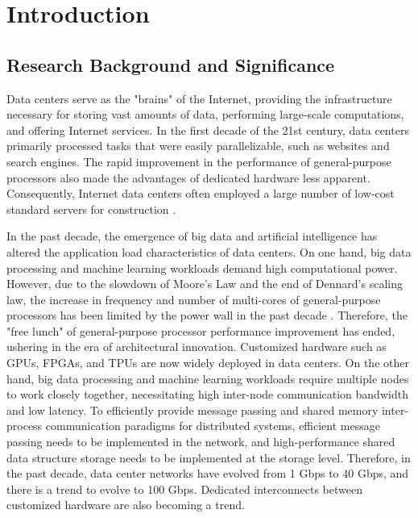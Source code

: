 \chapter{Introduction}
\label{chapter:intro}

\section{Research Background and Significance}
\label{intro:sec:background}

Data centers serve as the "brains" of the Internet, providing the infrastructure necessary for storing vast amounts of data, performing large-scale computations, and offering Internet services. In the first decade of the 21st century, data centers primarily processed tasks that were easily parallelizable, such as websites and search engines. The rapid improvement in the performance of general-purpose processors also made the advantages of dedicated hardware less apparent. Consequently, Internet data centers often employed a large number of low-cost standard servers for construction \cite{barroso2009datacenter}.

In the past decade, the emergence of big data and artificial intelligence has altered the application load characteristics of data centers. On one hand, big data processing and machine learning workloads demand high computational power. However, due to the slowdown of Moore's Law and the end of Dennard's scaling law, the increase in frequency and number of multi-cores of general-purpose processors has been limited by the power wall in the past decade \cite{borkar2011future}. Therefore, the "free lunch" of general-purpose processor performance improvement has ended, ushering in the era of architectural innovation. Customized hardware such as GPUs, FPGAs, and TPUs \cite{jouppi2018motivation} are now widely deployed in data centers. On the other hand, big data processing and machine learning workloads require multiple nodes to work closely together, necessitating high inter-node communication bandwidth and low latency. To efficiently provide message passing and shared memory inter-process communication paradigms for distributed systems, efficient message passing needs to be implemented in the network, and high-performance shared data structure storage needs to be implemented at the storage level. Therefore, in the past decade, data center networks have evolved from 1 Gbps to 40 Gbps, and there is a trend to evolve to 100 Gbps. Dedicated interconnects between customized hardware are also becoming a trend. %

